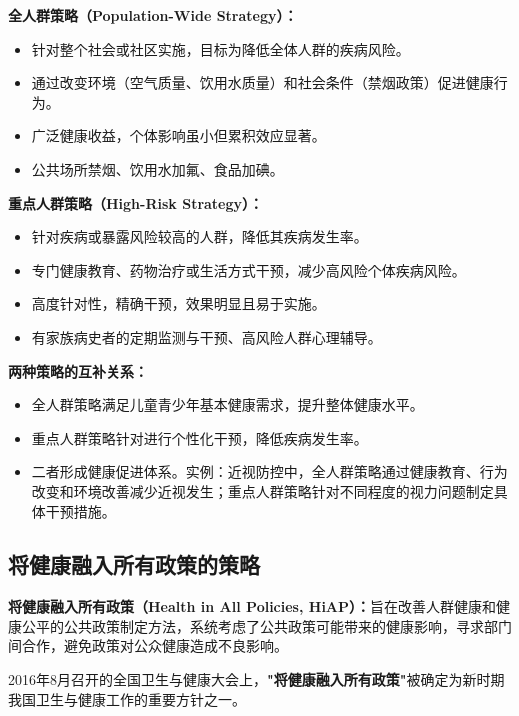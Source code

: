 \begin{keybox}
\textbf{全人群策略（Population-Wide Strategy）：}
\begin{itemize}[leftmargin=*]
    \item {}针对整个社会或社区实施，目标为降低全体人群的疾病风险。
    \item {}通过改变环境（空气质量、饮用水质量）和社会条件（禁烟政策）促进健康行为。
    \item {}广泛健康收益，个体影响虽小但累积效应显著。
    \item {}公共场所禁烟、饮用水加氟、食品加碘。
\end{itemize}

\textbf{重点人群策略（High-Risk Strategy）：}
\begin{itemize}[leftmargin=*]
    \item {}针对疾病或暴露风险较高的人群，降低其疾病发生率。
    \item {}专门健康教育、药物治疗或生活方式干预，减少高风险个体疾病风险。
    \item {}高度针对性，精确干预，效果明显且易于实施。
    \item {}有家族病史者的定期监测与干预、高风险人群心理辅导。
\end{itemize}

\vspace{4pt}
\textbf{两种策略的互补关系：}
\begin{itemize}[leftmargin=*]
    \item 全人群策略满足儿童青少年基本健康需求，提升整体健康水平。
    \item 重点人群策略针对进行个性化干预，降低疾病发生率。
    \item 二者形成健康促进体系。实例：近视防控中，全人群策略通过健康教育、行为改变和环境改善减少近视发生；重点人群策略针对不同程度的视力问题制定具体干预措施。
\end{itemize}
\end{keybox}

\subsection{将健康融入所有政策的策略}

\begin{keybox}
\textbf{将健康融入所有政策（Health in All Policies, HiAP）：}旨在改善人群健康和健康公平的公共政策制定方法，系统考虑了公共政策可能带来的健康影响，寻求部门间合作，避免政策对公众健康造成不良影响。

2016年8月召开的全国卫生与健康大会上，\textbf{"将健康融入所有政策"}被确定为新时期我国卫生与健康工作的重要方针之一。
\end{keybox}

\newpage
